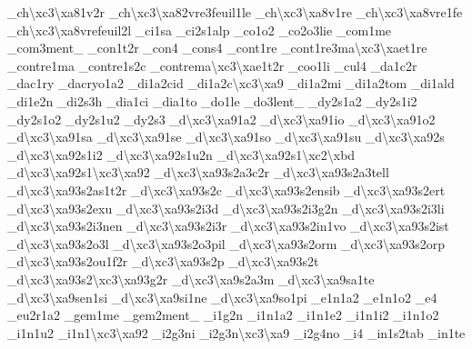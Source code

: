 {\-\_\-ch\textbackslash{}xc3\textbackslash{}xa81v2r \-\_\-ch\textbackslash{}xc3\textbackslash{}xa82vre3feuil1le \-\_\-ch\textbackslash{}xc3\textbackslash{}xa8v1re \-\_\-ch\textbackslash{}xc3\textbackslash{}xa8vre1fe \-\_\-ch\textbackslash{}xc3\textbackslash{}xa8vrefeuil2l \-\_\-ci1sa \-\_\-ci2s1alp \-\_\-co1o2 \-\_\-co2o3lie \-\_\-com1me \-\_\-com3ment\-\_\- \-\_\-con1t2r \-\_\-con4 \-\_\-cons4 \-\_\-cont1re \-\_\-cont1re3ma\textbackslash{}xc3\textbackslash{}xaet1re \-\_\-contre1ma \-\_\-contre1s2c \-\_\-contrema\textbackslash{}xc3\textbackslash{}xae1t2r \-\_\-coo1li \-\_\-cul4 \-\_\-da1c2r \-\_\-dac1ry \-\_\-dacryo1a2 \-\_\-di1a2cid \-\_\-di1a2c\textbackslash{}xc3\textbackslash{}xa9 \-\_\-di1a2mi \-\_\-di1a2tom \-\_\-di1ald \-\_\-di1e2n \-\_\-di2s3h \-\_\-dia1ci \-\_\-dia1to \-\_\-do1le \-\_\-do3lent\-\_\- \-\_\-dy2s1a2 \-\_\-dy2s1i2 \-\_\-dy2s1o2 \-\_\-dy2s1u2 \-\_\-dy2s3 \-\_\-d\textbackslash{}xc3\textbackslash{}xa91a2 \-\_\-d\textbackslash{}xc3\textbackslash{}xa91io \-\_\-d\textbackslash{}xc3\textbackslash{}xa91o2 \-\_\-d\textbackslash{}xc3\textbackslash{}xa91sa \-\_\-d\textbackslash{}xc3\textbackslash{}xa91se \-\_\-d\textbackslash{}xc3\textbackslash{}xa91so \-\_\-d\textbackslash{}xc3\textbackslash{}xa91su \-\_\-d\textbackslash{}xc3\textbackslash{}xa92s \-\_\-d\textbackslash{}xc3\textbackslash{}xa92s1i2 \-\_\-d\textbackslash{}xc3\textbackslash{}xa92s1u2n \-\_\-d\textbackslash{}xc3\textbackslash{}xa92s1\textbackslash{}xc2\textbackslash{}xbd \-\_\-d\textbackslash{}xc3\textbackslash{}xa92s1\textbackslash{}xc3\textbackslash{}xa92 \-\_\-d\textbackslash{}xc3\textbackslash{}xa93s2a3c2r \-\_\-d\textbackslash{}xc3\textbackslash{}xa93s2a3tell \-\_\-d\textbackslash{}xc3\textbackslash{}xa93s2as1t2r \-\_\-d\textbackslash{}xc3\textbackslash{}xa93s2c \-\_\-d\textbackslash{}xc3\textbackslash{}xa93s2ensib \-\_\-d\textbackslash{}xc3\textbackslash{}xa93s2ert \-\_\-d\textbackslash{}xc3\textbackslash{}xa93s2exu \-\_\-d\textbackslash{}xc3\textbackslash{}xa93s2i3d \-\_\-d\textbackslash{}xc3\textbackslash{}xa93s2i3g2n \-\_\-d\textbackslash{}xc3\textbackslash{}xa93s2i3li \-\_\-d\textbackslash{}xc3\textbackslash{}xa93s2i3nen \-\_\-d\textbackslash{}xc3\textbackslash{}xa93s2i3r \-\_\-d\textbackslash{}xc3\textbackslash{}xa93s2in1vo \-\_\-d\textbackslash{}xc3\textbackslash{}xa93s2ist \-\_\-d\textbackslash{}xc3\textbackslash{}xa93s2o3l \-\_\-d\textbackslash{}xc3\textbackslash{}xa93s2o3pil \-\_\-d\textbackslash{}xc3\textbackslash{}xa93s2orm \-\_\-d\textbackslash{}xc3\textbackslash{}xa93s2orp \-\_\-d\textbackslash{}xc3\textbackslash{}xa93s2ou1f2r \-\_\-d\textbackslash{}xc3\textbackslash{}xa93s2p \-\_\-d\textbackslash{}xc3\textbackslash{}xa93s2t \-\_\-d\textbackslash{}xc3\textbackslash{}xa93s2\textbackslash{}xc3\textbackslash{}xa93g2r \-\_\-d\textbackslash{}xc3\textbackslash{}xa9s2a3m \-\_\-d\textbackslash{}xc3\textbackslash{}xa9sa1te \-\_\-d\textbackslash{}xc3\textbackslash{}xa9sen1si \-\_\-d\textbackslash{}xc3\textbackslash{}xa9si1ne \-\_\-d\textbackslash{}xc3\textbackslash{}xa9so1pi \-\_\-e1n1a2 \-\_\-e1n1o2 \-\_\-e4 \-\_\-eu2r1a2 \-\_\-gem1me \-\_\-gem2ment\-\_\- \-\_\-i1g2n \-\_\-i1n1a2 \-\_\-i1n1e2 \-\_\-i1n1i2 \-\_\-i1n1o2 \-\_\-i1n1u2 \-\_\-i1n1\textbackslash{}xc3\textbackslash{}xa92 \-\_\-i2g3ni \-\_\-i2g3n\textbackslash{}xc3\textbackslash{}xa9 \-\_\-i2g4no \-\_\-i4 \-\_\-in1s2tab \-\_\-in1te }
